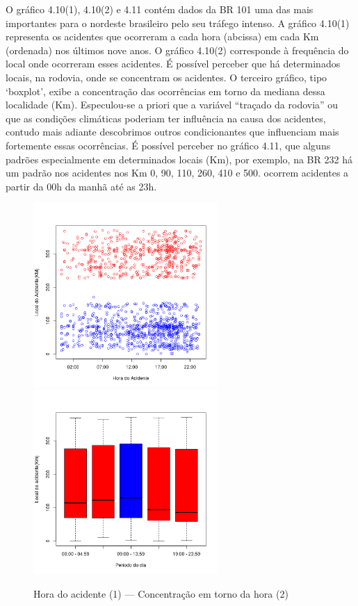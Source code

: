 O gráfico 4.10(1), 4.10(2)  e 4.11 contém dados da BR 101 uma das mais importantes para o nordeste brasileiro pelo seu tráfego intenso. 
A gráfico 4.10(1) representa os acidentes que ocorreram a cada hora (abcissa) em cada Km (ordenada) nos últimos nove anos. 
O  gráfico 4.10(2) corresponde à frequência do local onde ocorreram esses acidentes. 
É possível perceber que há determinados locais, na rodovia, onde se concentram os acidentes. 
O terceiro gráfico, tipo ‘boxplot’, exibe a concentração das ocorrências em torno da mediana dessa localidade (Km). 
Especulou-se a priori que a variável “traçado da rodovia” ou que as condições climáticas poderiam ter influência na causa dos acidentes, contudo mais adiante descobrimos outros condicionantes que influenciam mais fortemente essas ocorrências. 
É possível perceber no gráfico 4.11, que alguns padrões especialmente em determinados locais (Km), por exemplo, na BR 232 há um padrão nos acidentes nos Km 0, 90, 110, 260, 410 e
500. ocorrem acidentes a partir da 00h da manhã até as 23h. 


\pagebreak

\begin{figure}[h]
	\caption{Hora do acidente (1) --- Concentração em torno da hora (2)}
	\includegraphics[width=7cm,height=7cm]{Figuras/Preprocess/br316_1.png}
	\includegraphics[width=7cm,height=7cm]{Figuras/Preprocess/br316_2.png}

\end{figure}

